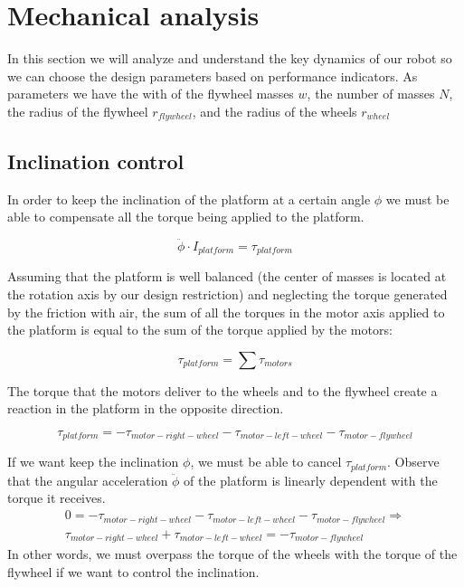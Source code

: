 \section{Mechanical analysis}
In this section we will analyze and understand the key dynamics of our robot so we can choose
the design parameters based on performance indicators. As parameters we have the with of the
flywheel masses $w$, the number of masses $N$, the radius of the flywheel $r_{flywheel}$, and
the radius of the wheels $r_{wheel}$

\subsection{Inclination control}
In order to keep the inclination of the platform at a certain angle $\phi$ 
we must be able to compensate all the torque being applied to the platform.

\[\ddot{\phi}\cdot I_{platform} = \tau_{platform} \]

Assuming that the platform is well balanced (the center of masses is located
at the rotation axis by our design restriction) and neglecting the torque generated
by the friction
with air, the sum of all the torques in the motor axis applied to the platform
is equal to the sum of the torque applied by the motors:

\[\tau_{platform} = \sum \tau_{motors}\]

The torque that the motors deliver to the wheels and to the flywheel create
a reaction in the platform in the opposite direction.

\[\tau_{platform} = -\tau_{motor-right-wheel} -\tau_{motor-left-wheel} -\tau_{motor-flywheel} \]

If we want keep the inclination $\phi$, we must be able to cancel $\tau_{platform}$.
Observe that the angular acceleration $\ddot{\phi}$ of the platform is linearly 
dependent with the torque it receives. 
\begin{equation} \label{eq:control equation}
\begin{split}
0 = -\tau_{motor-right-wheel} -\tau_{motor-left-wheel} -\tau_{motor-flywheel} \Rightarrow \\
\tau_{motor-right-wheel} +\tau_{motor-left-wheel} = -\tau_{motor-flywheel}
\end{split}
\end{equation}
In other words, we must overpass the torque of the wheels with the torque of the flywheel
if we want to control the inclination.

